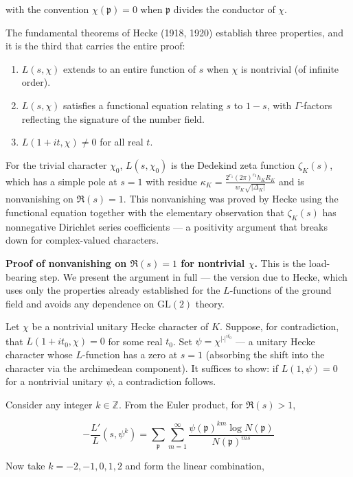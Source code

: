 \documentclass[12pt,a4paper]{article}
\begin{document}
with the convention $\chi(\mathfrak{p}) = 0$ when $\mathfrak{p}$ divides the conductor of $\chi$.

The fundamental theorems of Hecke (1918, 1920) establish three properties, and it is the third that carries the entire proof:

\begin{enumerate}
    \item $L(s, \chi)$ extends to an entire function of $s$ when $\chi$ is nontrivial (of infinite order).
    \item $L(s, \chi)$ satisfies a functional equation relating $s$ to $1-s$, with $\Gamma$-factors reflecting the signature of the number field.
    \item $L(1+it, \chi) \neq 0$ for all real $t$.
\end{enumerate}

For the trivial character $\chi_0$, $L(s, \chi_0)$ is the Dedekind zeta function $\zeta_K(s)$, which has a simple pole at $s=1$ with residue $\kappa_K = \frac{2^{r_1}(2\pi)^{r_2} h_K R_K}{w_K \sqrt{|\Delta_K|}}$ and is nonvanishing on $\Re(s)=1$. This nonvanishing was proved by Hecke using the functional equation together with the elementary observation that $\zeta_K(s)$ has nonnegative Dirichlet series coefficients --- a positivity argument that breaks down for complex-valued characters.

\textbf{Proof of nonvanishing on $\Re(s)=1$ for nontrivial $\chi$.} This is the load-bearing step. We present the argument in full --- the version due to Hecke, which uses only the properties already established for the $L$-functions of the ground field and avoids any dependence on $\mathrm{GL}(2)$ theory.

Let $\chi$ be a nontrivial unitary Hecke character of $K$. Suppose, for contradiction, that $L(1+it_0, \chi) = 0$ for some real $t_0$. Set $\psi = \chi^{|\cdot|^{it_0}}$ --- a unitary Hecke character whose $L$-function has a zero at $s=1$ (absorbing the shift into the character via the archimedean component). It suffices to show: if $L(1, \psi) = 0$ for a nontrivial unitary $\psi$, a contradiction follows.

Consider any integer $k \in \mathbb{Z}$. From the Euler product, for $\Re(s) > 1$,

\[
-\frac{L'}{L}(s, \psi^k) = \sum_{\mathfrak{p}} \sum_{m=1}^{\infty} \frac{\psi(\mathfrak{p})^{km} \log N(\mathfrak{p})}{N(\mathfrak{p})^{ms}}
\]

Now take $k = -2, -1, 0, 1, 2$ and form the linear combination,
\end{document}
